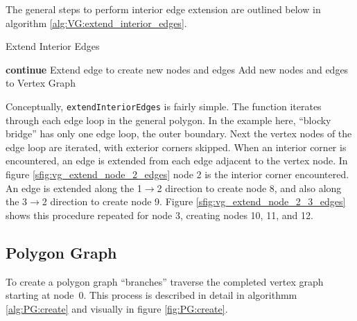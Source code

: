 The general steps to perform interior edge extension are outlined below in algorithm \ref{alg:VG:extend_interior_edges}.

\begin{algorithm}[htb]
\caption{Extend Interior Edges}\label{alg:VG:extend_interior_edges}
\begin{algorithmic}[1]
				\State \textbf{continue}
			\EndIf
				\State Extend edge to create new nodes and edges
				\State Add new nodes and edges to Vertex Graph
			\EndFor
		\EndFor
	\EndFor
\EndFunction
\end{algorithmic}
\end{algorithm}

Conceptually, \verb|extendInteriorEdges| is fairly simple.
The function iterates through each edge loop in the general polygon.
In the example here, ``blocky bridge'' has only one edge loop, the outer boundary.
Next the vertex nodes of the edge loop are iterated, with exterior corners skipped.
When an interior corner is encountered, an edge is extended from each edge adjacent to the vertex node.
In figure \ref{sfig:vg_extend_node_2_edges} node 2 is the interior corner encountered.
An edge is extended along the 1$\rightarrow$2 direction to create node 8, and also along the 3$\rightarrow$2 direction to create node 9.
Figure \ref{sfig:vg_extend_node_2_3_edges} shows this procedure repeated for node 3, creating nodes 10, 11, and 12.

\subsection{Polygon Graph}
To create a polygon graph ``branches'' traverse the completed vertex graph starting at node~0.
This process is described in detail in algorithmm \ref{alg:PG:create} and visually in figure \ref{fig:PG:create}.

